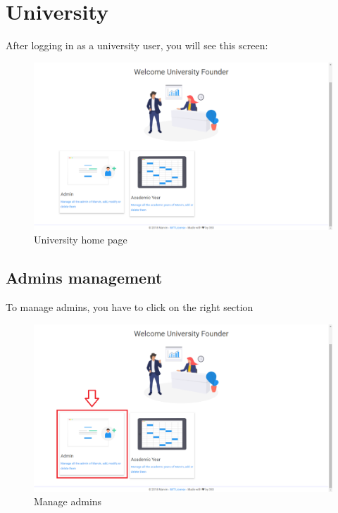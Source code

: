 \documentclass[ManualeUtente]{subfiles}
\begin{document}
	
	\chapter{University}
	After logging in as a university user, you will see this screen:
	\begin{figure}[H]
		\centering
		\includegraphics[width=0.7\linewidth]{./image/University}
		\caption[University]{University home page}
		\label{fig:university1}
	\end{figure}
	\newpage
	\section{Admins management}
	To manage admins, you have to click on the right section\\
	\begin{figure}[H]
		\centering
		\includegraphics[width=0.7\linewidth]{./image/UniAdmin}
		\caption[Manage admin]{Manage admins}
		\label{fig:uniadmin}
	\end{figure}
	
\end{document}
